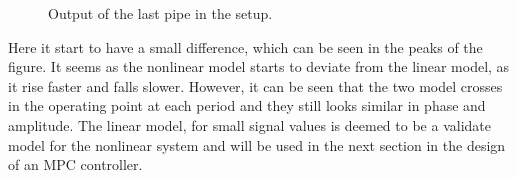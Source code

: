 \begin{figure}[H]
\centering

\caption{Output of the last pipe in the setup.}
\label{fig:linear_nonlinear_comparison_last_pipe}
\end{figure}

Here it start to have a small difference, which can be seen in the peaks of the figure. It seems as the nonlinear model starts to deviate from the linear model, as it rise faster and falls slower. However, it can be seen that the two model crosses in the operating point at each period and they still looks similar in phase and amplitude. The linear model, for small signal values is deemed to be a validate model for the nonlinear system and will be used in the next section in the design of an MPC controller. 